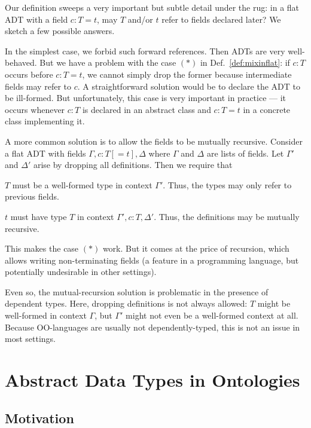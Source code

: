 \begin{remark}
Our definition sweeps a very important but subtle detail under the rug: in a flat ADT with a field $c:T=t$, may $T$ and/or $t$ refer to fields declared later?
We sketch a few possible answers.

In the simplest case, we forbid such forward references.
Then ADTs are very well-behaved.
But we have a problem with the case $(\ast)$ in Def.~\ref{def:mixinflat}: if $c:T$ occurs before $c:T=t$, we cannot simply drop the former because intermediate fields may refer to $c$.
A straightforward solution would be to declare the ADT to be ill-formed.
But unfortunately, this case is very important in practice --- it occurs whenever $c:T$ is declared in an abstract class and $c:T=t$ in a concrete class implementing it.

A more common solution is to allow the fields to be mutually recursive.
Consider a flat ADT with fields $\Gamma, c:T[=t], \Delta$ where $\Gamma$ and $\Delta$ are lists of fields.
Let $\Gamma'$ and $\Delta'$ arise by dropping all definitions.
Then we require that
\begin{compactitem}
 \item $T$ must be a well-formed type in context $\Gamma'$.
 Thus, the types may only refer to previous fields.
 \item $t$ must have type $T$ in context $\Gamma',c:T,\Delta'$.
 Thus, the definitions may be mutually recursive.
\end{compactitem}
This makes the case $(\ast)$ work.
But it comes at the price of recursion, which allows writing non-terminating fields (a feature in a programming language, but potentially undesirable in other settings).

Even so, the mutual-recursion solution is problematic in the presence of dependent types.
Here, dropping definitions is not always allowed:
$T$ might be well-formed in context $\Gamma$, but $\Gamma'$ might not even be a well-formed context at all.
Because OO-languages are usually not dependently-typed, this is not an issue in most settings.
\end{remark}

\section{Abstract Data Types in Ontologies}

\subsection{Motivation}

